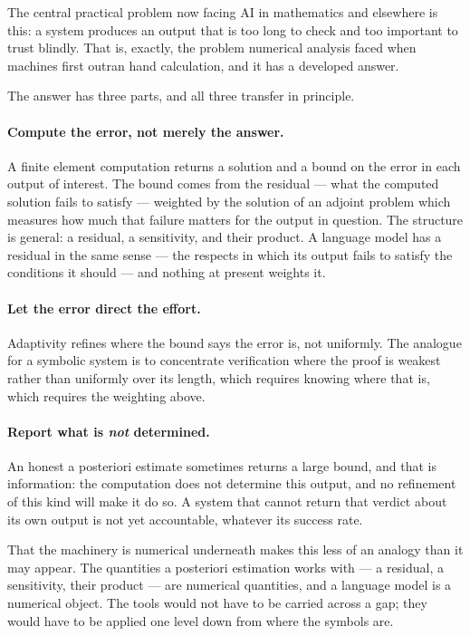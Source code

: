 \documentclass[11pt]{article}
\begin{document}
The central practical problem now facing AI in mathematics and elsewhere is this: a system produces
an output that is too long to check and too important to trust blindly. That is, exactly, the
problem numerical analysis faced when machines first outran hand calculation, and it has a
developed answer.

The answer has three parts, and all three transfer in principle.

\paragraph{Compute the error, not merely the answer.} A finite element computation returns a solution
and a bound on the error in each output of interest. The bound comes from the residual --- what the
computed solution fails to satisfy --- weighted by the solution of an adjoint problem which measures
how much that failure matters for the output in question. The structure is general: a residual, a
sensitivity, and their product. A language model has a residual in the same sense --- the respects
in which its output fails to satisfy the conditions it should --- and nothing at present weights it.

\paragraph{Let the error direct the effort.} Adaptivity refines where the bound says the error is,
not uniformly. The analogue for a symbolic system is to concentrate verification where the proof is
weakest rather than uniformly over its length, which requires knowing where that is, which requires
the weighting above.

\paragraph{Report what is \emph{not} determined.} An honest a posteriori estimate sometimes returns a
large bound, and that is information: the computation does not determine this output, and no
refinement of this kind will make it do so. A system that cannot return that verdict about its own
output is not yet accountable, whatever its success rate.

That the machinery is numerical underneath makes this less of an analogy than it may appear. The
quantities a posteriori estimation works with --- a residual, a sensitivity, their product --- are
numerical quantities, and a language model is a numerical object. The tools would not have to be
carried across a gap; they would have to be applied one level down from where the symbols are.
\end{document}
